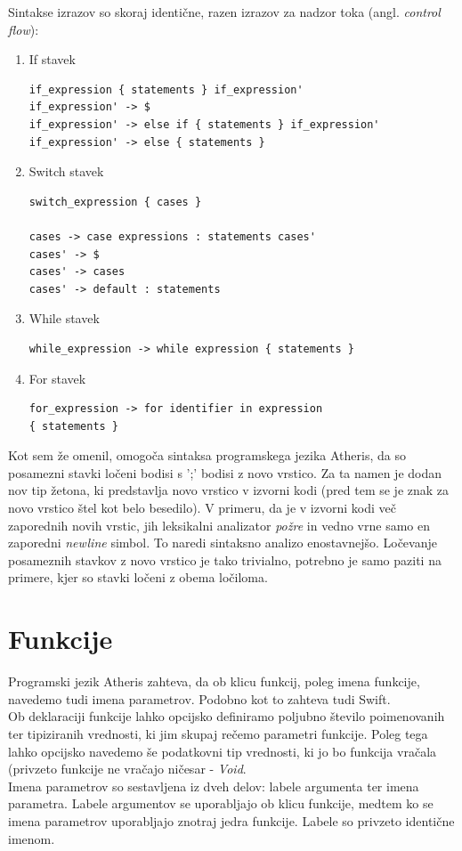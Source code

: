 \documentclass[a4paper, 12pt]{book}
\begin{document}
Sintakse izrazov so skoraj identične, razen izrazov za nadzor toka (angl. \textit{control flow}):

\begin{enumerate}
	\item If stavek
\begin{lstlisting}[]
if_expression { statements } if_expression'
if_expression' -> $
if_expression' -> else if { statements } if_expression'
if_expression' -> else { statements }
\end{lstlisting}
	\item Switch stavek
\begin{lstlisting}[]
switch_expression { cases }

cases -> case expressions : statements cases'
cases' -> $
cases' -> cases
cases' -> default : statements
\end{lstlisting}
	\item While stavek
\begin{lstlisting}[]
while_expression -> while expression { statements }
\end{lstlisting}
	\item For stavek
\begin{lstlisting}[]
for_expression -> for identifier in expression 
{ statements }
\end{lstlisting}
\end{enumerate} 

Kot sem že omenil, omogoča sintaksa programskega jezika Atheris, da so posamezni stavki ločeni bodisi s ';' bodisi z novo vrstico. Za ta namen je dodan nov tip žetona, ki predstavlja novo vrstico v izvorni kodi (pred tem se je znak za novo vrstico štel kot belo besedilo). V primeru, da je v izvorni kodi več zaporednih novih vrstic, jih leksikalni analizator \textit{požre} in vedno vrne samo en zaporedni \textit{newline} simbol. To naredi sintaksno analizo enostavnejšo. Ločevanje posameznih stavkov z novo vrstico je tako trivialno, potrebno je samo paziti na primere, kjer so stavki ločeni z obema ločiloma. 

\section{Funkcije}

Programski jezik Atheris zahteva, da ob klicu funkcij, poleg imena funkcije, navedemo tudi imena parametrov. Podobno kot to zahteva tudi Swift. \\
\indent Ob deklaraciji funkcije lahko opcijsko definiramo poljubno število poimenovanih ter tipiziranih vrednosti, ki jim skupaj rečemo parametri funkcije. Poleg tega lahko opcijsko navedemo še podatkovni tip vrednosti, ki jo bo funkcija vračala (privzeto funkcije ne vračajo ničesar - \textit{Void}. \\
\indent Imena parametrov so sestavljena iz dveh delov: labele argumenta ter imena parametra. Labele argumentov se uporabljajo ob klicu funkcije, medtem ko se imena parametrov uporabljajo znotraj jedra funkcije. Labele so privzeto identične imenom.
\end{document}
